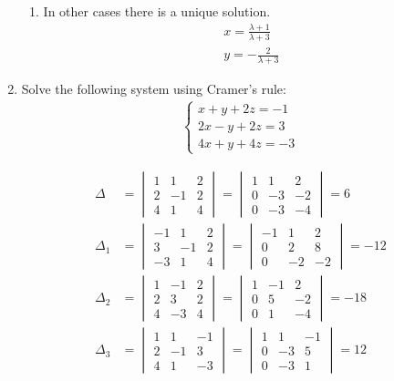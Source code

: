 \documentclass{article}
\begin{document}
\begin{enumerate}
\begin{enumerate}
\item In other cases there is a unique solution.
\begin{align*}
x =\frac{\lambda+1}{\lambda+3}\\
y = -\frac{2}{\lambda+3}
\end{align*}


\end{enumerate}

\newpage
\item Solve the following system using Cramer’s rule:
\begin{align*}
\begin{cases}
x+y+2z=-1\\
2x-y+2z=3\\
4x+y+4z=-3
\end{cases}
\end{align*}

\begin{align*}
\Delta &= \begin{vmatrix}
1&1&2\\
2&-1&2\\
4&1&4
\end{vmatrix}=\begin{vmatrix}
1&1&2\\
0&-3&-2\\
0&-3&-4
\end{vmatrix}=6\\
\Delta_1 &= \begin{vmatrix}
-1&1&2\\
3&-1&2\\
-3&1&4
\end{vmatrix}=\begin{vmatrix}
-1&1&2\\
0&2&8\\
0&-2&-2
\end{vmatrix}=-12\\
\Delta_2 &= \begin{vmatrix}
1&-1&2\\
2&3&2\\
4&-3&4
\end{vmatrix}=\begin{vmatrix}
1&-1&2\\
0&5&-2\\
0&1&-4
\end{vmatrix}=-18\\
\Delta_3 &= \begin{vmatrix}
1&1&-1\\
2&-1&3\\
4&1&-3
\end{vmatrix}=\begin{vmatrix}
1&1&-1\\
0&-3&5\\
0&-3&1
\end{vmatrix}=12
\end{align*}


\end{enumerate}
\end{document}
